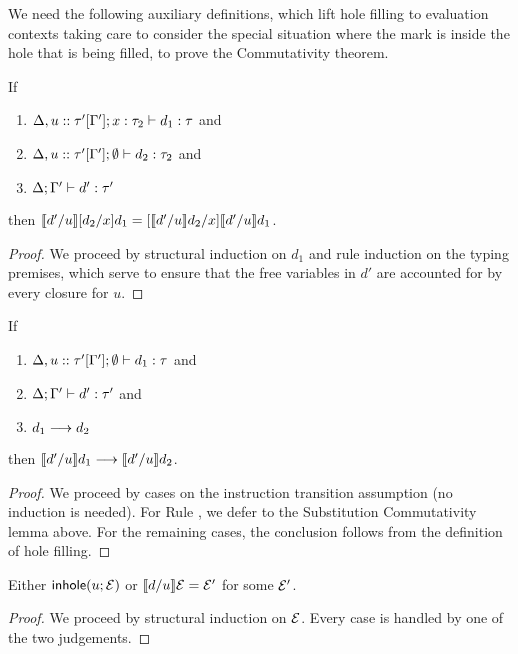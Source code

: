We need the following auxiliary definitions, which lift hole filling to evaluation contexts taking care to consider the special situation where the mark is inside the hole that is being filled, to prove the Commutativity theorem.

\begin{lem}
  If
  \begin{enumerate}[nolistsep]
  	\item $\Delta, u :: \tau'[\Gamma']; x : \tau_2 \vdash d_1 : \tau$ and
  	\item $\Delta, u :: \tau'[\Gamma']; \emptyset \vdash d_2 : \tau_2$ and
  	\item $\Delta; \Gamma' \vdash d' : \tau'$
  \end{enumerate}

  then  $\llbracket d' / u\rrbracket [d_2/x]d_1 = [\llbracket d' / u\rrbracket d_2/x]\llbracket d' / u\rrbracket d_1$.
\end{lem}
\begin{proof}
We proceed by structural induction on $d_1$ and rule induction on the typing premises, which serve to ensure that the free
variables in $d'$ are accounted for by every closure for $u$.
\end{proof}

\begin{lem}
  If
  \begin{enumerate}[nolistsep]
  	\item $\Delta, u :: \tau'[\Gamma']; \emptyset \vdash d_1 : \tau$ and
  	\item $\Delta; \Gamma' \vdash d' : \tau'$ and
  	\item $d_1 \longrightarrow d_2$
  \end{enumerate}

  then $\llbracket d' / u\rrbracket d_1 \longrightarrow \llbracket d' / u\rrbracket d_2$.
\end{lem}
\begin{proof}
We proceed by cases on the instruction transition assumption (no induction is needed). For Rule , we defer to the Substitution Commutativity lemma above. For the remaining cases, the conclusion follows from the definition of hole filling.
\end{proof}

\begin{lem}
Either $\mathsf{inhole}(u; \mathcal{E})$ or $\llbracket d / u\rrbracket \mathcal{E}=\mathcal{E}'$ for some $\mathcal{E}'$.
\end{lem}
\begin{proof} We proceed by structural induction on $\mathcal{E}$. Every case is handled by one of the two judgements. \end{proof}

